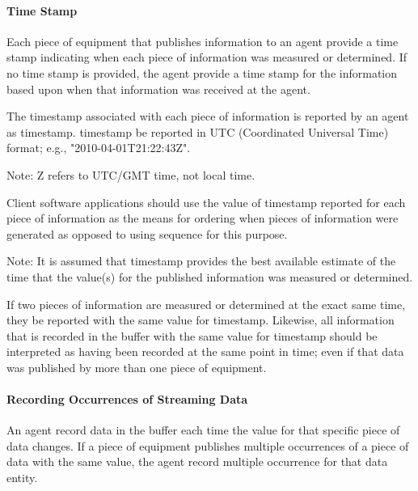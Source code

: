 \paragraph{Time Stamp}\mbox{}
\label{sec:Time Stamp}

Each piece of equipment that publishes information to an \gls{agent} \SHOULD provide a time stamp indicating when each piece of information was measured or determined.  If no time stamp is provided, the \gls{agent} \MUST provide a time stamp for the information based upon when that information was received at the \gls{agent}.

The \gls{timestamp} associated with each piece of information is reported by an \gls{agent} as \gls{timestamp}.  \gls{timestamp} \MUST be reported in UTC (Coordinated Universal Time) format; e.g., "2010-04-01T21:22:43Z".

\begin{note}
Note:  Z refers to UTC/GMT time, not local time.

\end{note}

Client software applications should use the value of \gls{timestamp} reported for each piece of information as the means for ordering when pieces of information were generated as opposed to using \gls{sequence} for this purpose.

\begin{note}
Note: It is assumed that \gls{timestamp} provides the best available estimate of the time that the value(s) for the published information was measured or determined.

\end{note}

If two pieces of information are measured or determined at the exact same time, they \MUST be reported with the same value for \gls{timestamp}.  Likewise, all information that is recorded in the \gls{buffer} with the same value for \gls{timestamp} should be interpreted as having been recorded at the same point in time; even if that data was published by more than one piece of equipment. 

\paragraph{Recording Occurrences of Streaming Data}\mbox{}

An \gls{agent} \MUST record data in the \gls{buffer} each time the value for that specific piece of data changes.  If a piece of equipment publishes multiple occurrences of a piece of data with the same value, the \gls{agent} \MUSTNOT record multiple occurrence for that \gls{data entity}.

